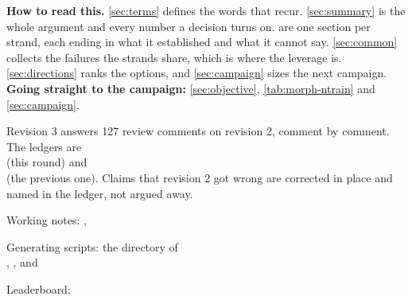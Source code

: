 \documentclass[10pt,a4paper]{article}
\begin{document}
\vspace{0.5em}
{\small\color{tcgray}
\textbf{How to read this.} \cref{sec:terms} defines the words that recur. \cref{sec:summary}
is the whole argument and every number a decision turns on.
 are one section per strand, each ending in what it
established and what it cannot say. \cref{sec:common} collects the failures the strands
share, which is where the leverage is. \cref{sec:directions} ranks the options, and
\cref{sec:campaign} sizes the next campaign. \textbf{Going straight to the campaign:}
\cref{sec:objective}, \cref{tab:morph-ntrain} and \cref{sec:campaign}.\par\smallskip

Revision 3 answers 127 review comments on revision 2, comment by comment. The ledgers are\\
 (this round) and\\
 (the previous one).
Claims that revision 2 got wrong are corrected in place and named in the ledger, not
argued away.\par\smallskip

Working notes: ,
\par
Generating scripts: the  directory of\\
, , and\\
\par
Leaderboard: \par}

\vspace{1em}
\tccontents

\clearpage











\end{document}
